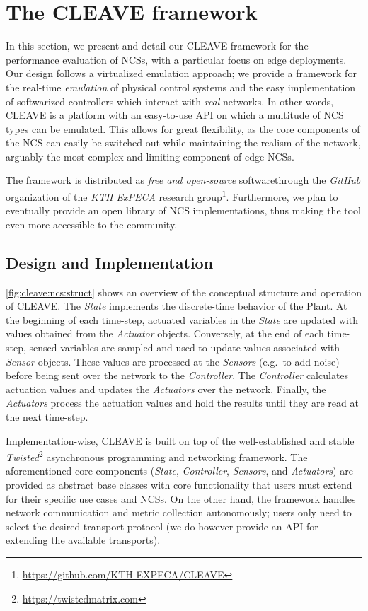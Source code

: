 \section{The \ac{CLEAVE} framework}\label{sec:approach}

In this section, we present and detail our \ac{CLEAVE} framework for the performance evaluation of \aclp{NCS}, with a particular focus on edge deployments.
Our design follows a virtualized emulation approach; we provide a framework for the real-time \emph{emulation} of physical control systems and the easy implementation of softwarized controllers which interact with \emph{real} networks.
In other words, \ac{CLEAVE} is a platform with an easy-to-use \ac{API} on which a multitude of \ac{NCS} types can be emulated.
This allows for great flexibility, as the core components of the \ac{NCS} can easily be switched out while maintaining the realism of the network, arguably the most complex and limiting component of edge \acp{NCS}.

The framework is distributed as \emph{free and open-source} softwarethrough the \emph{GitHub} organization of the \emph{KTH ExPECA} research group\footnote{\url{https://github.com/KTH-EXPECA/CLEAVE}}.
Furthermore, we plan to eventually provide an open library of \ac{NCS} implementations, thus making the tool even more accessible to the community.

\subsection{Design and Implementation}

\cref{fig:cleave:ncs:struct} shows an overview of the conceptual structure and operation of \ac{CLEAVE}.
The \emph{State} implements the discrete-time behavior of the Plant.
At the beginning of each time-step, actuated variables in the \emph{State} are updated with values obtained from the \emph{Actuator} objects.
Conversely, at the end of each time-step, sensed variables are sampled and used to update values associated with \emph{Sensor} objects.
These values are processed at the \emph{Sensors} (e.g.\ to add noise) before being sent over the network to the \emph{Controller}.
The \emph{Controller} calculates actuation values and updates the \emph{Actuators} over the network.
Finally, the \emph{Actuators} process the actuation values and hold the results until they are read at the next time-step.

Implementation-wise, \ac{CLEAVE} is built on top of the well-established and stable \emph{Twisted}\footnote{\url{https://twistedmatrix.com}} asynchronous programming and networking framework.
The aforementioned core components (\emph{State}, \emph{Controller}, \emph{Sensors}, and \emph{Actuators}) are provided as abstract base classes with core functionality that users must extend for their specific use cases and \acp{NCS}.
On the other hand, the framework handles network communication and metric collection autonomously; users only need to select the desired transport protocol (we do however provide an \ac{API} for extending the available transports).

